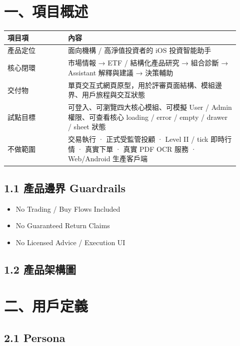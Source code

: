 
\section{一、項目概述}

\begingroup
\small
\begin{longtable}{L{0.24\linewidth}L{0.68\linewidth}}
\toprule
\textbf{項目項} & \textbf{內容} \\
\midrule
產品定位 & 面向機構 / 高淨值投資者的 iOS 投資智能助手 \\
核心閉環 & 市場情報 → ETF / 結構化產品研究 → 組合診斷 → Assistant 解釋與建議 → 決策輔助 \\
交付物 & 單頁交互式網頁原型，用於評審頁面結構、模組邊界、用戶旅程與交互狀態 \\
試點目標 & 可登入、可瀏覽四大核心模組、可模擬 User / Admin 權限、可查看核心 loading / error / empty / drawer / sheet 狀態 \\
不做範圍 & 交易執行 · 正式受監管投顧 · Level II / tick 即時行情 · 真實下單 · 真實 PDF OCR 服務 · Web/Android 生產客戶端 \\
\bottomrule
\end{longtable}
\endgroup

\subsection{1.1 產品邊界 Guardrails}

\begin{itemize}
\item No Trading / Buy Flows Included
\item No Guaranteed Return Claims
\item No Licensed Advice / Execution UI
\end{itemize}

\subsection{1.2 產品架構圖}


\section{二、用戶定義}

\subsection{2.1 Persona}


